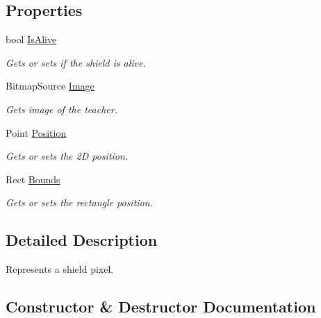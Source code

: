 \subsection*{Properties}
\begin{DoxyCompactItemize}
\item 
bool \mbox{\hyperlink{class_o_e_invaders_1_1_library_1_1_shield_a382da408fc8a2a841cc53365e93666d8}{Is\+Alive}}
\begin{DoxyCompactList}\small\item\em Gets or sets if the shield is alive. \end{DoxyCompactList}\item 
Bitmap\+Source \mbox{\hyperlink{class_o_e_invaders_1_1_library_1_1_shield_a01a9c1803df27690c3fba63c2fe73d68}{Image}}
\begin{DoxyCompactList}\small\item\em Gets image of the teacher. \end{DoxyCompactList}\item 
Point \mbox{\hyperlink{class_o_e_invaders_1_1_library_1_1_shield_a4c5ea918425ebd9b922f9d463f69f583}{Position}}
\begin{DoxyCompactList}\small\item\em Gets or sets the 2D position. \end{DoxyCompactList}\item 
Rect \mbox{\hyperlink{class_o_e_invaders_1_1_library_1_1_shield_a4531df7073fb8f60774b9a56f4f2b2db}{Bounds}}
\begin{DoxyCompactList}\small\item\em Gets or sets the rectangle position. \end{DoxyCompactList}\end{DoxyCompactItemize}


\subsection{Detailed Description}
Represents a shield pixel. 



\subsection{Constructor \& Destructor Documentation}
\mbox{\label{class_o_e_invaders_1_1_library_1_1_shield_a83a096af7e5531d2a57bbd4164f7a9de}} 
